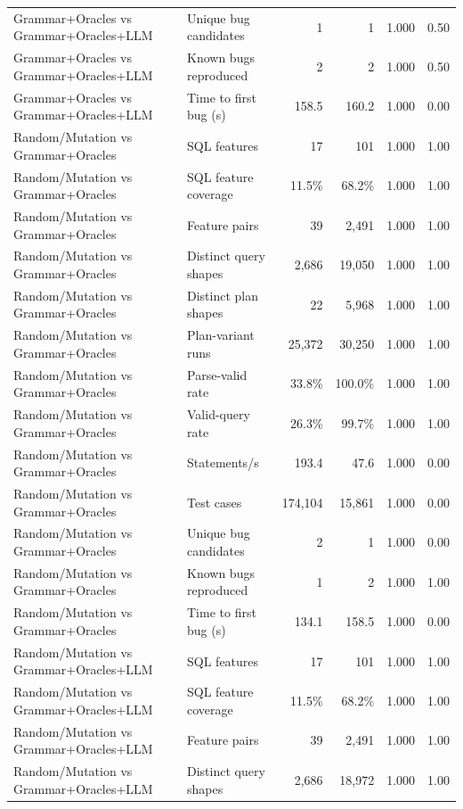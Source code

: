 \begin{table}[t]
\begin{tabular}{llrrrr}
    Grammar+Oracles vs Grammar+Oracles+LLM & Unique bug candidates & 1 & 1 & 1.000 & 0.50 \\
    Grammar+Oracles vs Grammar+Oracles+LLM & Known bugs reproduced & 2 & 2 & 1.000 & 0.50 \\
    Grammar+Oracles vs Grammar+Oracles+LLM & Time to first bug (s) & 158.5 & 160.2 & 1.000 & 0.00 \\
    Random/Mutation vs Grammar+Oracles & SQL features & 17 & 101 & 1.000 & 1.00 \\
    Random/Mutation vs Grammar+Oracles & SQL feature coverage & 11.5\% & 68.2\% & 1.000 & 1.00 \\
    Random/Mutation vs Grammar+Oracles & Feature pairs & 39 & 2{,}491 & 1.000 & 1.00 \\
    Random/Mutation vs Grammar+Oracles & Distinct query shapes & 2{,}686 & 19{,}050 & 1.000 & 1.00 \\
    Random/Mutation vs Grammar+Oracles & Distinct plan shapes & 22 & 5{,}968 & 1.000 & 1.00 \\
    Random/Mutation vs Grammar+Oracles & Plan-variant runs & 25{,}372 & 30{,}250 & 1.000 & 1.00 \\
    Random/Mutation vs Grammar+Oracles & Parse-valid rate & 33.8\% & 100.0\% & 1.000 & 1.00 \\
    Random/Mutation vs Grammar+Oracles & Valid-query rate & 26.3\% & 99.7\% & 1.000 & 1.00 \\
    Random/Mutation vs Grammar+Oracles & Statements/s & 193.4 & 47.6 & 1.000 & 0.00 \\
    Random/Mutation vs Grammar+Oracles & Test cases & 174{,}104 & 15{,}861 & 1.000 & 0.00 \\
    Random/Mutation vs Grammar+Oracles & Unique bug candidates & 2 & 1 & 1.000 & 0.00 \\
    Random/Mutation vs Grammar+Oracles & Known bugs reproduced & 1 & 2 & 1.000 & 1.00 \\
    Random/Mutation vs Grammar+Oracles & Time to first bug (s) & 134.1 & 158.5 & 1.000 & 0.00 \\
    Random/Mutation vs Grammar+Oracles+LLM & SQL features & 17 & 101 & 1.000 & 1.00 \\
    Random/Mutation vs Grammar+Oracles+LLM & SQL feature coverage & 11.5\% & 68.2\% & 1.000 & 1.00 \\
    Random/Mutation vs Grammar+Oracles+LLM & Feature pairs & 39 & 2{,}491 & 1.000 & 1.00 \\
    Random/Mutation vs Grammar+Oracles+LLM & Distinct query shapes & 2{,}686 & 18{,}972 & 1.000 & 1.00 \\

\end{tabular}
\end{table}
